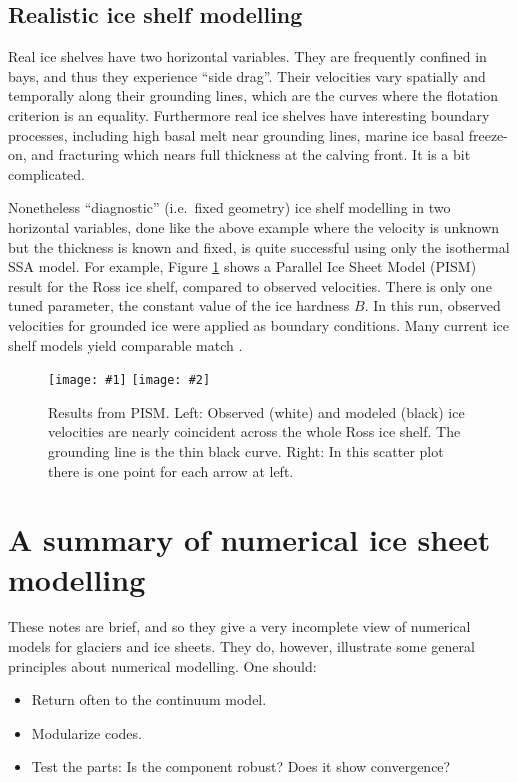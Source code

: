 \documentclass[letterpaper,final,12pt,reqno]{amsart}
\newcommand{\twofigsizes}[5]{
\begin{figure}[ht]
\centering
\texttt{[image: \#1]} \quad
\texttt{[image: \#2]}
\caption{#3}
\label{fig:#1}
\end{figure}}
\begin{document}
\subsection*{Realistic ice shelf modelling}  Real ice shelves have two horizontal variables.  They are frequently confined in bays, and thus they experience ``side drag''.  Their velocities vary spatially and temporally along their grounding lines, which are the curves where the flotation criterion is an equality.  Furthermore real ice shelves have interesting boundary processes, including high basal melt near grounding lines, marine ice basal freeze-on, and fracturing which nears full thickness at the calving front.  It is a bit complicated.

Nonetheless ``diagnostic'' (i.e.~fixed geometry) ice shelf modelling in two horizontal variables, done like the above example where the velocity is unknown but the thickness is known and fixed, is quite successful using only the isothermal SSA model.  For example, Figure \ref{fig:rossquiver} shows a Parallel Ice Sheet Model (PISM) result for the Ross ice shelf, compared to observed velocities.  There is only one tuned parameter, the constant value of the ice hardness $B$.  In this run, observed velocities for grounded ice were applied as boundary conditions.  Many current ice shelf models yield comparable match \cite{MacAyealetal}.

\twofigsizes{rossquiver}{rossscatter}{Results from PISM.  Left: Observed (white) and modeled (black) ice velocities are nearly coincident across the whole Ross ice shelf.  The grounding line is the thin black curve.  Right: In this scatter plot there is one point for each arrow at left.}{3.0in}{3.0in}


\section{A summary of numerical ice sheet modelling}

These notes are brief, and so they give a very incomplete view of numerical models for glaciers and ice sheets.  They do, however, illustrate some general principles about numerical modelling.  One should:
\begin{itemize}
\item Return often to the continuum model.
\item Modularize codes.
\item Test the parts: Is the component robust? Does it show convergence?
\end{itemize}
\end{document}
